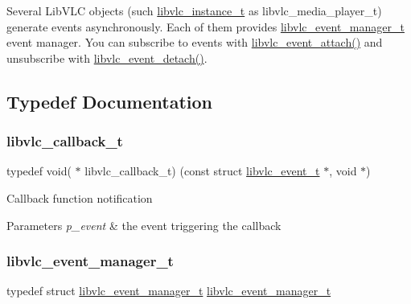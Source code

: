 Several Lib\+V\+LC objects (such \hyperlink{group__libvlc__core_ga316d739a80da4678206c79f4d6c2e284}{libvlc\+\_\+instance\+\_\+t} as libvlc\+\_\+media\+\_\+player\+\_\+t) generate events asynchronously. Each of them provides \hyperlink{group__libvlc__event_gaa82f247503d3558b9117550e8d3c9259}{libvlc\+\_\+event\+\_\+manager\+\_\+t} event manager. You can subscribe to events with \hyperlink{group__libvlc__event_gaed9956a22efad4f466ffd4ec8ab45926}{libvlc\+\_\+event\+\_\+attach()} and unsubscribe with \hyperlink{group__libvlc__event_ga25b19849dc46d9a57be6815920a17e16}{libvlc\+\_\+event\+\_\+detach()}. 

\subsection{Typedef Documentation}
\mbox{\label{group__libvlc__event_gafb4d63849005e4dce5b2180a40144fe4}} 
\subsubsection{\texorpdfstring{libvlc\+\_\+callback\+\_\+t}{libvlc\_callback\_t}}
{\footnotesize\ttfamily typedef void( $\ast$ libvlc\+\_\+callback\+\_\+t) (const struct \hyperlink{structlibvlc__event__t}{libvlc\+\_\+event\+\_\+t} $\ast$, void $\ast$)}

Callback function notification 
\begin{DoxyParams}{Parameters}
{\em p\+\_\+event} & the event triggering the callback \\
\hline
\end{DoxyParams}
\mbox{\label{group__libvlc__event_gaa82f247503d3558b9117550e8d3c9259}} 
\subsubsection{\texorpdfstring{libvlc\+\_\+event\+\_\+manager\+\_\+t}{libvlc\_event\_manager\_t}}
{\footnotesize\ttfamily typedef struct \hyperlink{group__libvlc__event_gaa82f247503d3558b9117550e8d3c9259}{libvlc\+\_\+event\+\_\+manager\+\_\+t} \hyperlink{group__libvlc__event_gaa82f247503d3558b9117550e8d3c9259}{libvlc\+\_\+event\+\_\+manager\+\_\+t}}

